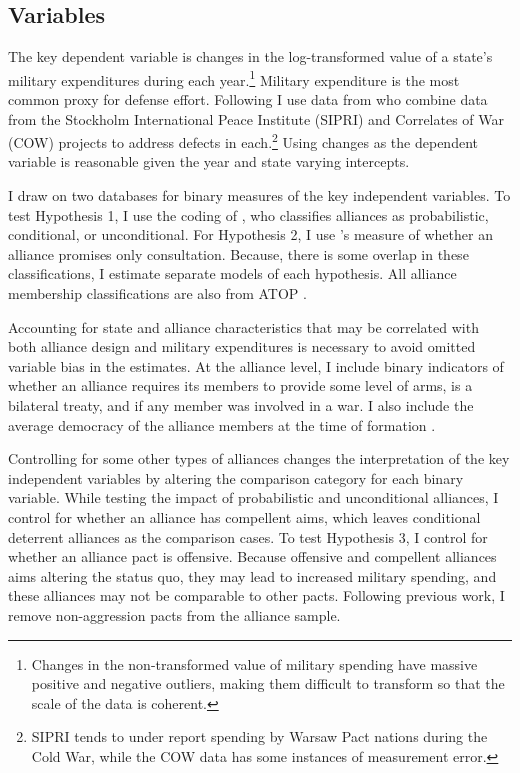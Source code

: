 \documentclass[12pt]{article}
\begin{document}
\subsection*{Variables} 

The key dependent variable is changes in the log-transformed value of a state's military expenditures during each year.\footnote{Changes in the non-transformed value of military spending have massive positive and negative outliers, making them difficult to transform so that the scale of the data is coherent.} Military expenditure is the most common proxy for defense effort. Following\citet{DigiuseppePoast2016} I use data from \citet{Nordhausetal2012} who combine data from the Stockholm International Peace Institute (SIPRI) and Correlates of War (COW) projects to address defects in each.\footnote{SIPRI tends to under report spending by Warsaw Pact nations during the Cold War, while the COW data has some instances of measurement error.} Using changes as the dependent variable is reasonable given the year and state varying intercepts. 

I draw on two databases for binary measures of the key independent variables. To test Hypothesis 1, I use the coding of \citet{Benson2012}, who classifies alliances as probabilistic, conditional, or unconditional. For Hypothesis 2, I use \citet{Chibaetal2015}'s measure of whether an alliance promises only consultation.  Because, there is some overlap in these classifications, I estimate separate models of each hypothesis. All alliance membership classifications are also from ATOP \citep{Leedsetal2002}. 

Accounting for state and alliance characteristics that may be correlated with both alliance design and military expenditures is necessary to avoid omitted variable bias in the estimates. At the alliance level, I include binary indicators of whether an alliance requires its members to provide some level of arms, is a bilateral treaty, and if any member was involved in a war. I also include the average democracy of the alliance members at the time of formation \citep{Chibaetal2015}. 

Controlling for some other types of alliances changes the interpretation of the key independent variables by altering the comparison category for each binary variable. While testing the impact of probabilistic and unconditional alliances, I control for whether an alliance has compellent aims, which leaves conditional deterrent alliances as the comparison cases. To test Hypothesis 3, I control for whether an alliance pact is offensive. Because offensive and compellent alliances aims altering the status quo, they may lead to increased military spending, and these alliances may not be comparable to other pacts. Following previous work, I remove non-aggression pacts from the alliance sample. 
\end{document}
